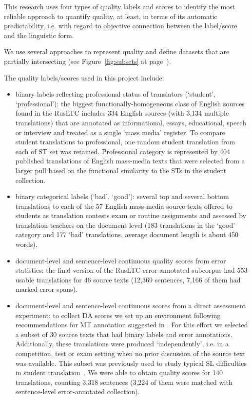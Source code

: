This research uses four types of quality labels and scores to identify the most reliable approach to quantify quality, at least, in terms of its automatic predictability, i.e. with regard to objective connection between the label/score and the linguistic form.

We use several approaches to represent quality and define datasets that are partially intersecting (see Figure~\ref{fig:subsets} at page~\pageref{pg:subsets}).

The quality labels/scores used in this project include:

\begin{itemize}\compresslist{}
	\item binary labels reflecting professional status of translators (`student', `professional'): the biggest functionally-homogeneous class of English sources found in the \gls*{RusLTC} includes 334 English sources (with 3,134 multiple translations) that are annotated as informational, essays, educational, speech or interview and treated as a single `mass media' register. To compare student translations to professional, one random student translation from each of ST set was retained. Professional category is represented by 404 published translations of English mass-media texts that were selected from a larger pull based on the functional similarity to the STs in the student collection.
	\label{pg:binary_qua_labels_corpus}
	\item binary categorical labels (`bad', `good'): several top and several bottom translations to each of the 57 English mass-media source texts offered to students as translation contests exam or routine assignments and assessed by translation teachers on the document level (183 translations in the `good' category and 177 `bad' translations, average document length is about 450 words). 
	
	\item document-level and sentence-level continuous quality scores from error statistics: the final version of the \gls*{RusLTC} error-annotated subcorpus had 553 usable translations for 46 source texts (12,369 sentences, 7,166 of them had marked error spans). 
	
	\item document-level and sentence-level continuous scores from a direct assessment experiment: to collect DA scores we set up an environment following recommendations for \gls*{MT} annotation suggested in \citet{Graham2013, Graham2015, Guzman2019, Laubli2020}. For this effort we selected a subset of 30 source texts that had binary labels and error annotations. Additionally, these translations were produced `independently', i.e. in a competition, test or exam setting when no prior discussion of the source text was available. This subset was previously used to study typical \gls*{SL} difficulties in student translation~\cite{Kunilovskaya2022err}. We were able to obtain quality scores for 140 translations, counting 3,318 sentences (3,224 of them were matched with sentence-level error-annotated collection). 
\end{itemize}


